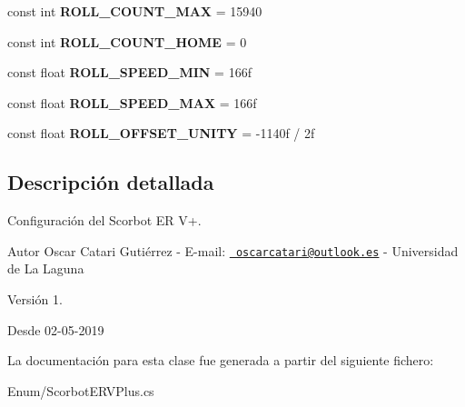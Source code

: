 \begin{DoxyCompactItemize}
\mbox{\label{class_scorbot_e_r_v_plus_a6b4dccd567267712c12fde6fc8cc06b6}} 
const int {\bfseries R\+O\+L\+L\+\_\+\+C\+O\+U\+N\+T\+\_\+\+M\+AX} = 15940
\item 
\mbox{\label{class_scorbot_e_r_v_plus_a913690cd60c5fd21a1fe275a54743fae}} 
const int {\bfseries R\+O\+L\+L\+\_\+\+C\+O\+U\+N\+T\+\_\+\+H\+O\+ME} = 0
\item 
\mbox{\label{class_scorbot_e_r_v_plus_a4b1c28f7c0e51649f763b8a2cf6167dd}} 
const float {\bfseries R\+O\+L\+L\+\_\+\+S\+P\+E\+E\+D\+\_\+\+M\+IN} = 166f
\item 
\mbox{\label{class_scorbot_e_r_v_plus_a3f13b313829c31207c13a8111e20c851}} 
const float {\bfseries R\+O\+L\+L\+\_\+\+S\+P\+E\+E\+D\+\_\+\+M\+AX} = 166f
\item 
\mbox{\label{class_scorbot_e_r_v_plus_afa2d3d2a05b3d973bd12da3ac2171835}} 
const float {\bfseries R\+O\+L\+L\+\_\+\+O\+F\+F\+S\+E\+T\+\_\+\+U\+N\+I\+TY} = -\/1140f / 2f
\end{DoxyCompactItemize}


\subsection{Descripción detallada}
Configuración del Scorbot ER V+. \begin{DoxyAuthor}{Autor}
Oscar Catari Gutiérrez -\/ E-\/mail\+: \href{mailto:oscarcatari@outlook.es}{\texttt{ oscarcatari@outlook.\+es}} -\/ Universidad de La Laguna 
\end{DoxyAuthor}
\begin{DoxyVersion}{Versión}
1. 
\end{DoxyVersion}
\begin{DoxySince}{Desde}
02-\/05-\/2019 
\end{DoxySince}


La documentación para esta clase fue generada a partir del siguiente fichero\+:\begin{DoxyCompactItemize}
\item 
Enum/Scorbot\+E\+R\+V\+Plus.\+cs\end{DoxyCompactItemize}
